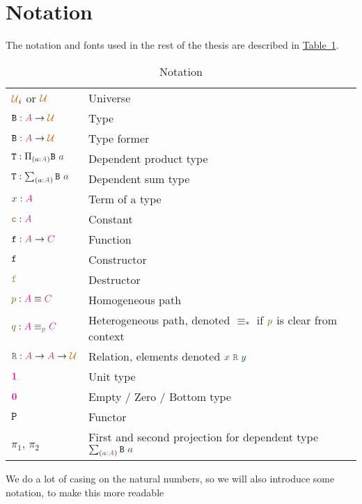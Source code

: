 \documentclass[twoside,11pt,openright]{report}
\theoremstyle{plain} %
\theoremstyle{definition}
\theoremstyle{remark}
\newcommand*{\tableref}[1]{\hyperref[table:#1]{Table~\ref*{table:#1}}}
\newcommand*{\term}[1]{\textcolor{green!30!black}{#1}} %
\newcommand*{\pathterm}[1]{\textcolor{green!65!red!75!black}{#1}}
\newcommand*{\type}[1]{\textcolor{magenta!90!black}{#1}}
\newcommand*{\universe}[1]{\textcolor{orange!80!black}{#1}}
\newcommand*{\unit}{\type{\textbf{1}}}
\newcommand*{\empt}{\type{\textbf{0}}}
\newcommand*{\relation}[1]{\textcolor{gray!75!black}{\ensuremath{\mathtt{#1}}}}
\newcommand*{\constant}[1]{\textcolor{orange!60!black}{\ensuremath{\mathtt{#1}}}}
\newcommand*{\function}[1]{\textcolor{blue!60!black}{\ensuremath{\mathtt{#1}}}}
\newcommand*{\constructor}[1]{\textcolor{purple!60!black}{\ensuremath{\mathtt{#1}}}}
\newcommand*{\destructor}[1]{\textcolor{yellow!60!black}{\ensuremath{\mathtt{#1}}}}
\newcommand*{\typeformer}[1]{\ensuremath{\mathtt{#1}}}
\newcommand*{\functor}[1]{\ensuremath{\mathbf{\mathtt{#1}}}}
\begin{document}
\section{Notation}
The notation and fonts used in the rest of the thesis are described in \tableref{notation}.
\begin{table}[h]
  \begin{tabular}[h]{ll}
    \(\universe{\mathcal{U}}_i\) or \(\universe{\mathcal{U}}\) & Universe \\
    \(\typeformer{B} : \type{A} \rightarrow \universe{\mathcal{U}}\) & Type \\
    \(\typeformer{B} : \type{A} \rightarrow \universe{\mathcal{U}}\) & Type former \\
    \(\typeformer{T} : \Pi_{(a : \type{A})} \typeformer{B}~\term{a}\) & Dependent product type \\
    \(\typeformer{T} : \sum_{(a : \type{A})} \typeformer{B}~\term{a}\) & Dependent sum type \\
    \(\term{x} : \type{A}\) & Term of a type \\
    \(\constant{c} : \type{A}\) & Constant \\
    \(\function{f} : \type{A} \rightarrow \type{C}\) & Function \\
    \(\constructor{f}\) & Constructor \\
    \(\destructor{f}\) & Destructor \\
    \(\pathterm{p} : \type{A} \equiv \type{C}\) & Homogeneous path \\
    \(\pathterm{q} : \type{A} \equiv_{\pathterm{p}} \type{C}\) & Heterogeneous path, denoted \(\equiv_{*}\) if \(\pathterm{p}\) is clear from context \\
    \(\relation{R} : \type{A} \rightarrow \type{A} \rightarrow \universe{\mathcal{U}}\) & Relation, elements denoted \(\term{x}~\relation{R}~\term{y}\)\\
    \(\unit\) & Unit type \\
    \(\empt\) & Empty / Zero / Bottom type \\
    \(\functor{P}\) & Functor \\
    \(\pi_1\), \(\pi_2\) &  First and second projection for dependent type \(\sum_{(\term{a} : \type{A})} \typeformer{B}~\term{a}\)
  \end{tabular}
  \caption{Notation}
  \label{table:notation}
\end{table}
We do a lot of casing on the natural numbers, so we will also introduce some notation, to make this more readable
\end{document}
